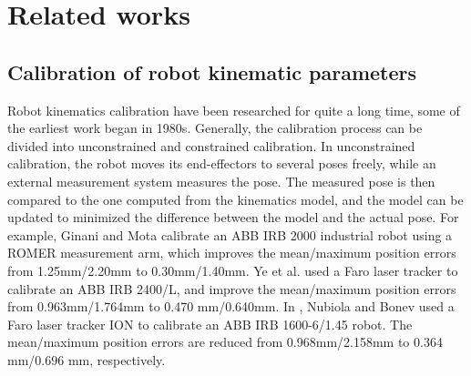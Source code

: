 \section{Related works}
\label{sec:related}
\subsection{Calibration of robot kinematic parameters}
\label{sec:kine_calib}
Robot kinematics calibration have been researched for quite a long time, some of the earliest work began in 1980s. Generally, the calibration process can be divided into unconstrained and constrained calibration. In unconstrained calibration, the robot moves its end-effectors to several poses freely, while an external measurement system measures the pose. The measured pose is then compared to the one computed from the kinematics model, and the model can be updated to minimized the difference between the model and the actual pose. 
For example, Ginani and Mota \cite{Ginani2011}  calibrate an ABB IRB 2000 industrial robot using a ROMER measurement arm, which improves the mean/maximum position errors from 1.25mm/2.20mm to 0.30mm/1.40mm. 
Ye et al. \cite{Ye2006} used a Faro laser tracker to calibrate an ABB IRB 2400/L, and improve the mean/maximum position errors from 0.963mm/1.764mm to 0.470 mm/0.640mm. 
 In \cite{Nubiola2013}, Nubiola and Bonev used a Faro laser tracker ION to calibrate an ABB IRB 1600-6/1.45 robot. The mean/maximum position errors are reduced from 0.968mm/2.158mm to 0.364 mm/0.696 mm, respectively.

